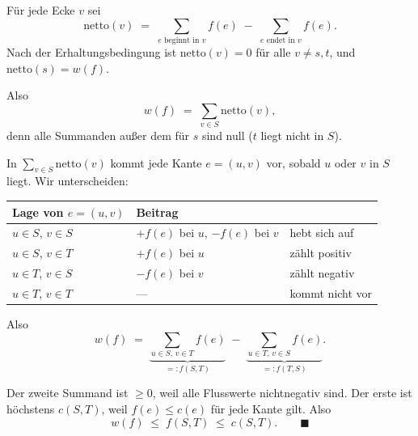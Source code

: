 \begin{merksatz}
Für jede Ecke $v$ sei
\[ \text{netto}(v) \;=\; \sum_{e \text{ beginnt in } v} f(e) \;-\; \sum_{e \text{ endet in } v} f(e) . \]
Nach der Erhaltungsbedingung ist $\text{netto}(v) = 0$ für alle $v \neq s,t$, und $\text{netto}(s) = w(f)$.

Also
\[ w(f) \;=\; \sum_{v \in S} \text{netto}(v) , \]
denn alle Summanden außer dem für $s$ sind null ($t$ liegt nicht in $S$).

In $\sum_{v \in S} \text{netto}(v)$ kommt jede Kante $e = (u,v)$ vor, sobald $u$ oder $v$ in $S$ liegt. Wir unterscheiden:

\begin{center}
{\small
\renewcommand{\arraystretch}{1.48}
\begin{tabular}{@{}P{2.6cm}P{2.6cm}P{3.0cm}@{}}
\toprule
\textbf{Lage von $e=(u,v)$} & \textbf{Beitrag} & \\
\midrule
$u \in S$, $v \in S$ & $+f(e)$ bei $u$, $-f(e)$ bei $v$ & \textcolor{grau}{hebt sich auf}\\
$u \in S$, $v \in T$ & $+f(e)$ bei $u$ & \textcolor{gruen}{zählt positiv}\\
$u \in T$, $v \in S$ & $-f(e)$ bei $v$ & \textcolor{akzent}{zählt negativ}\\
$u \in T$, $v \in T$ & --- & \textcolor{grau}{kommt nicht vor}\\
\bottomrule
\end{tabular}}
\end{center}

Also
\[ w(f) \;=\; \underbrace{\sum_{u \in S,\, v \in T} f(e)}_{=: f(S,T)} \;-\; \underbrace{\sum_{u \in T,\, v \in S} f(e)}_{=: f(T,S)} . \]

Der zweite Summand ist $\ge 0$, weil alle Flusswerte nichtnegativ sind. Der erste ist höchstens $c(S,T)$, weil $f(e) \le c(e)$ für jede Kante gilt. Also
\[ w(f) \;\le\; f(S,T) \;\le\; c(S,T) . \qquad \blacksquare \]
\end{merksatz}

